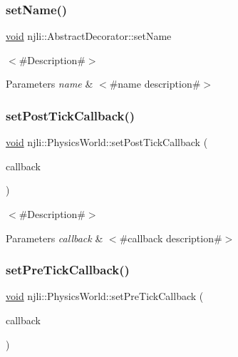 \subsubsection{\texorpdfstring{set\+Name()}{setName()}}
{\footnotesize\ttfamily \mbox{\hyperlink{_thread_8h_af1e856da2e658414cb2456cb6f7ebc66}{void}} njli\+::\+Abstract\+Decorator\+::set\+Name}

$<$\#\+Description\#$>$


\begin{DoxyParams}{Parameters}
{\em name} & $<$\#name description\#$>$ \\
\hline
\end{DoxyParams}
\mbox{\label{classnjli_1_1_physics_world_a727d1fa784603c527fd210a6b9950842}} 
\subsubsection{\texorpdfstring{set\+Post\+Tick\+Callback()}{setPostTickCallback()}}
{\footnotesize\ttfamily \mbox{\hyperlink{_thread_8h_af1e856da2e658414cb2456cb6f7ebc66}{void}} njli\+::\+Physics\+World\+::set\+Post\+Tick\+Callback (\begin{DoxyParamCaption}\item[{bt\+Internal\+Tick\+Callback}]{callback }\end{DoxyParamCaption})}

$<$\#\+Description\#$>$


\begin{DoxyParams}{Parameters}
{\em callback} & $<$\#callback description\#$>$ \\
\hline
\end{DoxyParams}
\mbox{\label{classnjli_1_1_physics_world_a0fc4b0b757a0fa74f289a9186e26fc5d}} 
\subsubsection{\texorpdfstring{set\+Pre\+Tick\+Callback()}{setPreTickCallback()}}
{\footnotesize\ttfamily \mbox{\hyperlink{_thread_8h_af1e856da2e658414cb2456cb6f7ebc66}{void}} njli\+::\+Physics\+World\+::set\+Pre\+Tick\+Callback (\begin{DoxyParamCaption}\item[{bt\+Internal\+Tick\+Callback}]{callback }\end{DoxyParamCaption})}

